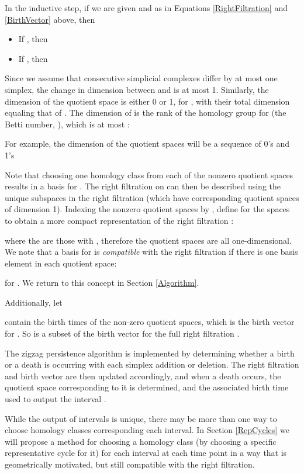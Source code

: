 \documentclass[12pt]{article}
\begin{document}
In the inductive step, if we are given  and  as in Equations \ref{RightFiltration} and \ref{BirthVector} above, then
\begin{itemize}
\item If , then

\item If , then

\end{itemize}

Since we assume that consecutive simplicial complexes differ by at most one simplex, the change in dimension between  and  is at most 1. Similarly, the dimension of the quotient space  is either 0 or 1, for , with their total dimension equaling that of . The dimension of  is the rank of the homology group for  (the Betti number, ), which is at most :

For example, the dimension of the quotient spaces will be a sequence of 0's and 1's


Note that choosing one homology class from each of the nonzero quotient spaces results in a basis for . The right filtration on  can then be described using the unique subspaces in the right filtration (which have corresponding quotient spaces of dimension 1). Indexing the nonzero quotient spaces by , define  for the spaces  to obtain a more compact representation of the right filtration :


where the  are those with , therefore the quotient spaces  are all one-dimensional. We note that a basis  for  is \emph{compatible} with the right filtration  if there is one basis element in each quotient space:

for . We return to this concept in Section \ref{Algorithm}.

Additionally, let

contain the birth times of the non-zero quotient spaces, which is the birth vector for . So  is a subset of the birth vector  for the full right filtration .

The zigzag persistence algorithm is implemented by determining whether a birth or a death is occurring with each simplex addition or deletion. The right filtration and birth vector are then updated accordingly, and when a death occurs, the quotient space  corresponding to it is determined, and the associated birth time  used to output the interval .

While the output of intervals  is unique, there may be more than one way to choose homology classes corresponding each interval. In Section \ref{RepCycles} we will propose a method for choosing a homology class (by choosing a specific representative cycle for it) for each interval at each time point in a way that is geometrically motivated, but still compatible with the right filtration.
\end{document}
